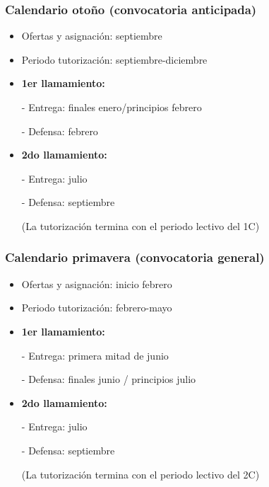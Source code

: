 \documentclass[aspectratio=43]{beamer}
\begin{document}
\begin{frame}
\frametitle{Calendario otoño (convocatoria anticipada)}
\centering

\begin{itemize}
  \item Ofertas y asignación: septiembre
  \item Periodo tutorización: septiembre-diciembre
  \item[]
  \item \textbf{1er llamamiento:}
  \item[-] Entrega: finales enero/principios febrero
  \item[-] Defensa: febrero
  \item[]
  \item \textbf{2do llamamiento:}
  \item[-] Entrega: julio
  \item[-] Defensa: septiembre
  \item[] (La tutorización termina con el periodo lectivo del 1C)
\end{itemize}

\end{frame}

\begin{frame}
\frametitle{Calendario primavera (convocatoria general)}
\centering

\begin{itemize}
  \item Ofertas y asignación: inicio febrero
  \item Periodo tutorización: febrero-mayo
  \item[]
  \item \textbf{1er llamamiento:}
  \item[-] Entrega: primera mitad de junio
  \item[-] Defensa: finales junio / principios julio
  \item[]
  \item \textbf{2do llamamiento:}
  \item[-] Entrega: julio
  \item[-] Defensa: septiembre
  \item[] (La tutorización termina con el periodo lectivo del 2C)
\end{itemize}

\end{frame}
\end{document}
